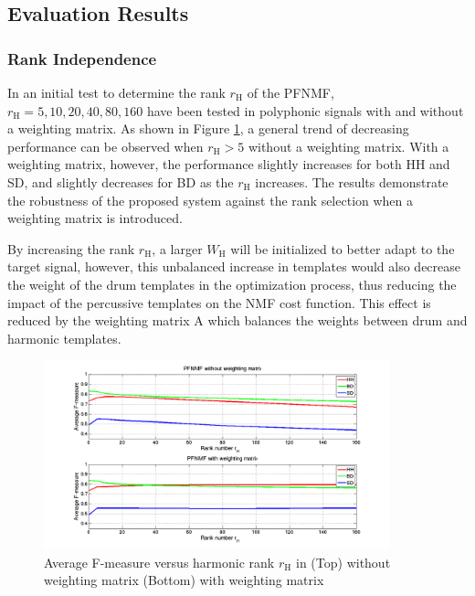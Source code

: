 \documentclass{article}
\begin{document}
\subsection{Evaluation Results}\label{subsec:evaluation results}

\subsubsection{Rank Independence}\label{subsubsec:rank}
In an initial test to determine the rank $r_\mathrm{H}$ of the PFNMF, $r_\mathrm{H} = {5, 10, 20, 40, 80, 160}$ have been tested in polyphonic signals with and without a weighting matrix. As shown in Figure \ref{fig:rankTest}, a general trend of decreasing performance can be observed when $r_\mathrm{H} > 5$ without a weighting matrix. With a weighting matrix, however, the performance slightly increases for both HH and SD, and slightly decreases for BD as the $r_\mathrm{H}$ increases. The results demonstrate the robustness of the proposed system against the rank selection when a weighting matrix is introduced.

By increasing the rank $r_\mathrm{H}$, a larger $W_\mathrm{H}$ will be initialized to better adapt to the target signal, however, this unbalanced increase in templates would also decrease the weight of the drum templates in the optimization process, thus reducing the impact of the percussive templates on the NMF cost function. This effect is reduced by the weighting matrix $\mathrm{A}$ which balances the weights between drum and harmonic templates. 


\begin{figure}
 \centerline{
 \includegraphics[width=10cm]{rankTest_2.png}}
 \caption{Average F-measure versus harmonic rank $r_\mathrm{H}$ in (Top) without weighting matrix (Bottom) with weighting matrix}
 \label{fig:rankTest}
\end{figure}
\end{document}
